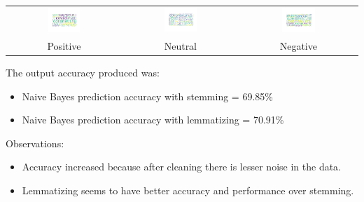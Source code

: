 \documentclass[12pt]{article}
\begin{document}
\begin{enumerate}[label=(\alph*)]
          \begin{center}
              \begin{center}
                  \begin{tabular}{c c c}
                      \includegraphics[width=0.3\textwidth]{Images/Q1/d/ptext.png} & \includegraphics[width=0.3\textwidth]{Images/Q1/d/neutext.png} &
                      \includegraphics[width=0.3\textwidth]{Images/Q1/d/ntext.png}                                                                             \\
                      Positive                                                     & Neutral                                                        & Negative
                  \end{tabular}
              \end{center}
          \end{center}

          The output accuracy produced was:
          \begin{itemize}
              \item Naive Bayes prediction accuracy with stemming = 69.85\%
              \item Naive Bayes prediction accuracy with lemmatizing = 70.91\%
          \end{itemize}

          Observations:
          \begin{itemize}
              \item Accuracy increased because after cleaning there is lesser noise in the data.
              \item Lemmatizing seems to have better accuracy and performance over stemming.
          \end{itemize}




\end{enumerate}
\end{document}
